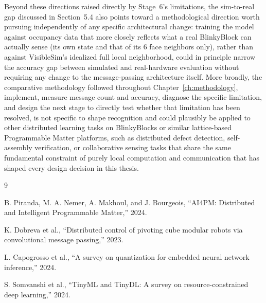 \documentclass[12pt,a4paper]{report}
\begin{document}
Beyond these directions raised directly by Stage~6's limitations, the sim-to-real gap discussed in Section~5.4 also points toward a methodological direction worth pursuing independently of any specific architectural change: training the model against occupancy data that more closely reflects what a real BlinkyBlock can actually sense (its own state and that of its 6 face neighbors only), rather than against VisibleSim's idealized full local neighborhood, could in principle narrow the accuracy gap between simulated and real-hardware evaluation without requiring any change to the message-passing architecture itself. More broadly, the comparative methodology followed throughout Chapter~\ref{ch:methodology}, implement, measure message count and accuracy, diagnose the specific limitation, and design the next stage to directly test whether that limitation has been resolved, is not specific to shape recognition and could plausibly be applied to other distributed learning tasks on BlinkyBlocks or similar lattice-based Programmable Matter platforms, such as distributed defect detection, self-assembly verification, or collaborative sensing tasks that share the same fundamental constraint of purely local computation and communication that has shaped every design decision in this thesis.

\begin{thebibliography}{9}

B. Piranda, M. A. Nemer, A. Makhoul, and J. Bourgeois,
``AI4PM: Distributed and Intelligent Programmable Matter,''
2024.

K. Dobreva et al.,
``Distributed control of pivoting cube modular robots via convolutional message passing,''
2023.

L. Capogrosso et al.,
``A survey on quantization for embedded neural network inference,''
2024.

S. Somvanshi et al.,
``TinyML and TinyDL: A survey on resource-constrained deep learning,''
2024.

\end{thebibliography}
\end{document}
